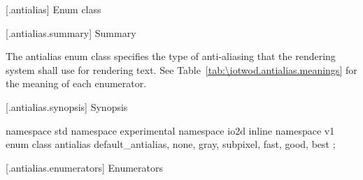 [\iotwod.antialias] {Enum class }

 [\iotwod.antialias.summary] { Summary}

\pnum
The antialias enum class specifies the type of anti-aliasing that the rendering
system shall use for rendering text. See 
Table~\ref{tab:\iotwod.antialias.meanings} for the meaning of each
 enumerator.

 [\iotwod.antialias.synopsis] { Synopsis}

\begin{codeblock}
namespace std { namespace experimental { namespace io2d { inline namespace v1 {
  enum class antialias {
    default_antialias,
    none,
    gray,
    subpixel,
    fast,
    good,
    best
  };
} } } }
\end{codeblock}

 [\iotwod.antialias.enumerators] { Enumerators}


